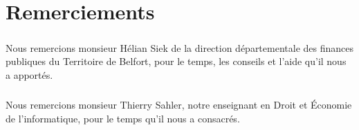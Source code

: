 \chapter*{Remerciements}

\paragraph{}
    Nous remercions monsieur Hélian Siek de la direction départementale des
    finances publiques du Territoire de Belfort, pour le temps, les conseils et l'aide qu'il nous a apportés.

\paragraph{}
    Nous remercions monsieur Thierry Sahler, notre enseignant en Droit et Économie de l'informatique, pour le temps qu'il nous a consacrés.
